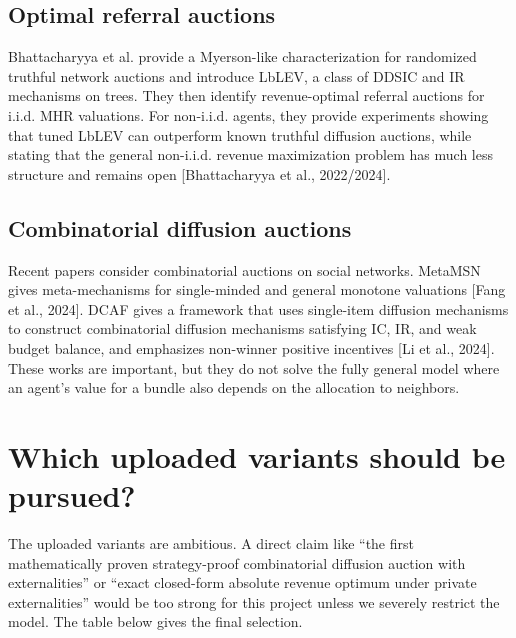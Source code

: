 \documentclass[11pt]{article}
\begin{document}
\subsection{Optimal referral auctions}

Bhattacharyya et al. provide a Myerson-like characterization for randomized truthful network auctions and introduce LbLEV, a class of DDSIC and IR mechanisms on trees. They then identify revenue-optimal referral auctions for i.i.d. MHR valuations. For non-i.i.d. agents, they provide experiments showing that tuned LbLEV can outperform known truthful diffusion auctions, while stating that the general non-i.i.d. revenue maximization problem has much less structure and remains open [Bhattacharyya et al., 2022/2024].

\subsection{Combinatorial diffusion auctions}

Recent papers consider combinatorial auctions on social networks. MetaMSN gives meta-mechanisms for single-minded and general monotone valuations [Fang et al., 2024]. DCAF gives a framework that uses single-item diffusion mechanisms to construct combinatorial diffusion mechanisms satisfying IC, IR, and weak budget balance, and emphasizes non-winner positive incentives [Li et al., 2024]. These works are important, but they do not solve the fully general model where an agent's value for a bundle also depends on the allocation to neighbors.

\section{Which uploaded variants should be pursued?}

The uploaded variants are ambitious. A direct claim like ``the first mathematically proven strategy-proof combinatorial diffusion auction with externalities'' or ``exact closed-form absolute revenue optimum under private externalities'' would be too strong for this project unless we severely restrict the model. The table below gives the final selection.
\end{document}
